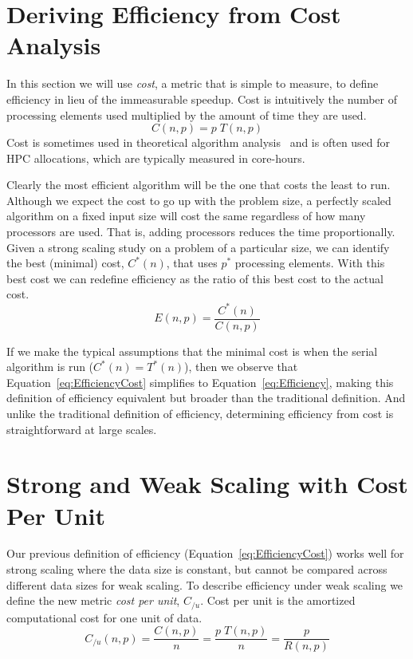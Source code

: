 \documentclass{llncs}
\newcommand*{\lcite}[1]{~\cite{#1}}
\newcommand*{\keyterm}[1]{\emph{#1}}
\begin{document}
\section{Deriving Efficiency from Cost Analysis}
\label{sec:CostAnalysis}

\noindent
In this section we will use \keyterm{cost}, a metric that is simple to
measure, to define efficiency in lieu of the immeasurable speedup. Cost is
intuitively the number of processing elements used multiplied by the amount
of time they are used.
\begin{equation}
  C(n,p) = p \; T(n,p)
  \label{eq:Cost}
\end{equation}
Cost is sometimes used in theoretical algorithm analysis\lcite{JaJa1992}
and is often used for HPC allocations, which are typically measured in
core-hours.

Clearly the most efficient algorithm will be the one that costs the least
to run. Although we expect the cost to go up with the problem size, a
perfectly scaled algorithm on a fixed input size will cost the same
regardless of how many processors are used. That is, adding processors
reduces the time proportionally. Given a strong scaling study on a problem
of a particular size, we can identify the best (minimal) cost, $C^*(n)$,
that uses $p^*$ processing elements. With this best cost we can redefine
efficiency as the ratio of this best cost to the actual cost.
\begin{equation}
  E(n,p) = \frac{C^*(n)}{C(n,p)}
  \label{eq:EfficiencyCost}
\end{equation}

If we make the typical assumptions that the minimal cost is when the serial
algorithm is run ($C^*(n) = T^*(n)$), then we observe that
Equation~\ref{eq:EfficiencyCost} simplifies to
Equation~\ref{eq:Efficiency}, making this definition of efficiency
equivalent but broader than the traditional definition. And unlike the
traditional definition of efficiency, determining efficiency from cost is
straightforward at large scales.


\section{Strong and Weak Scaling with Cost Per Unit}
\label{sec:CostPerUnit}

\noindent
Our previous definition of efficiency (Equation~\ref{eq:EfficiencyCost})
works well for strong scaling where the data size is constant, but cannot
be compared across different data sizes for weak scaling. To describe
efficiency under weak scaling we define the new metric \keyterm{cost per
  unit}, $C_{/u}$. Cost per unit is the amortized computational cost for
one unit of data.
\begin{equation}
  C_{/u}(n,p) = \frac{C(n,p)}{n} = \frac{p \; T(n,p)}{n}
  = \frac{p}{R(n,p)}
  \label{eq:CostPerUnit}
\end{equation}
\end{document}
